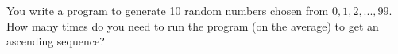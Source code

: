   You write a program to generate 10 random numbers chosen from
  $0, 1, 2, ..., 99$.
  How many times do you need to run the program (on the average)
  to get an ascending sequence?
